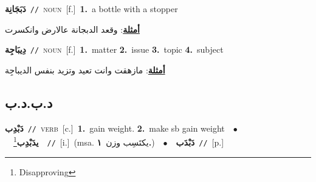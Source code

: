 \documentclass[10pt,a4paper,twoside]{article} %
\begin{document}
\begin{multicols}{2}
{\setlength\topsep{0pt}\textbf{\foreignlanguage{arabic}{دَبَجَانِة}}\ {\color{gray}\texttt{//}\color{black}}\ \textsc{noun}\ [f.]\ \textbf{1.}~a bottle with a stopper\  \begin{flushright}\color{gray}\foreignlanguage{arabic}{\textbf{\underline{\foreignlanguage{arabic}{أمثلة}}}: وقعد الدبجانة عالارض وانكسرت}\end{flushright}\color{black}} \vspace{2mm}

{\setlength\topsep{0pt}\textbf{\foreignlanguage{arabic}{دِيبَاجِة}}\ {\color{gray}\texttt{//}\color{black}}\ \textsc{noun}\ [f.]\ \textbf{1.}~matter  \textbf{2.}~issue  \textbf{3.}~topic  \textbf{4.}~subject\  \begin{flushright}\color{gray}\foreignlanguage{arabic}{\textbf{\underline{\foreignlanguage{arabic}{أمثلة}}}: مازهقت وانت تعيد وتزيد بنفس الديباجِة}\end{flushright}\color{black}} \vspace{2mm}

\vspace{-3mm}
\subsection*{\color{blue}\foreignlanguage{arabic}{د.ب.د.ب}\color{blue}{}} 

{\setlength\topsep{0pt}\textbf{\foreignlanguage{arabic}{دَبْدِب}}\ {\color{gray}\texttt{//}\color{black}}\ \textsc{verb}\ [c.]\ \textbf{1.}~gain weight.  \textbf{2.}~make sb gain weight\ \ $\bullet$\ \ \setlength\topsep{0pt}\textbf{\foreignlanguage{arabic}{يدَبْدِب}}\footnote{Disapproving}\ \ {\color{gray}\texttt{//}\color{black}}\ [i.]\ \color{gray}(msa. \foreignlanguage{arabic}{يكتَسِب وزن}~\foreignlanguage{arabic}{\textbf{١.}})\color{black}\ \ $\bullet$\ \ \setlength\topsep{0pt}\textbf{\foreignlanguage{arabic}{دَبْدَب}}\ {\color{gray}\texttt{//}\color{black}}\ [p.]\ 

}
\end{multicols}
\end{document}

